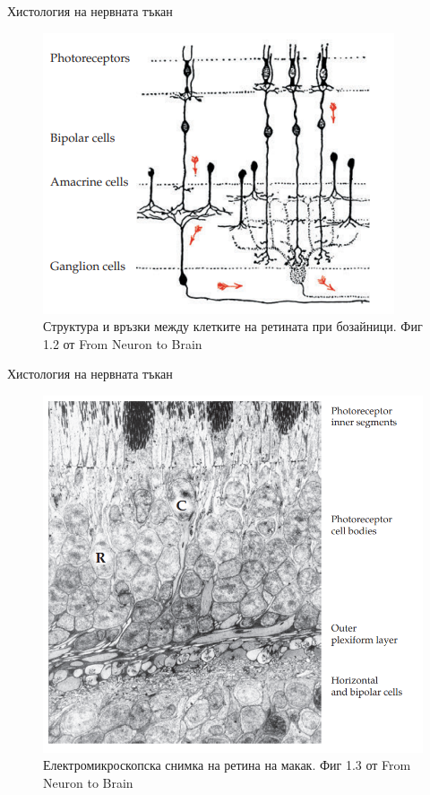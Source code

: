 \begin{frame}[t]{Хистология на нервната тъкан}
    \begin{figure}[htbp!]
      \centering
      \includegraphics[width=\textwidth,height=0.7\textheight,keepaspectratio]{neuron-complex.PNG}
      \caption{Структура и връзки между клетките на ретината при бозайници. Фиг 1.2 от From Neuron to Brain}
    \end{figure}
\end{frame}

\begin{frame}[t]{Хистология на нервната тъкан}
    \begin{figure}[htbp!]
      \centering
      \includegraphics[width=\textwidth,height=0.7\textheight,keepaspectratio]{neurons-macaque.PNG}
      \caption{Електромикроскопска снимка на ретина на макак. Фиг 1.3 от From Neuron to Brain}
    \end{figure}
\end{frame}

